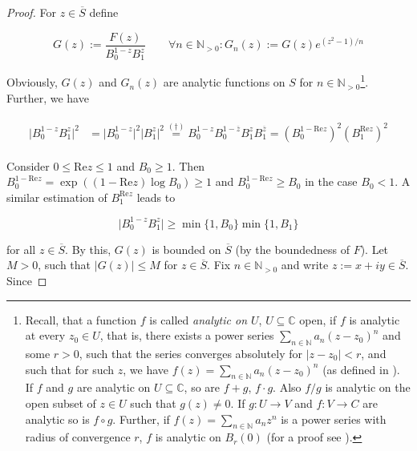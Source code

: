 \begin{proof}
	For $z \in \overline{S}$ define 

\begin{equation}
	G(z) := \frac{F(z)}{B_0^{1 - z}B_1^z} \qquad \forall n \in \mathbb{N}_{>0}: G_n(z) := G(z) e^{(z^2 - 1)/n} 
\end{equation}

Obviously, $G(z)$ and $G_n(z)$ are analytic functions on $S$ for $n \in \mathbb{N}_{>0}$\footnote{
						Recall, that a function $f$ is called \emph{analytic on $U$}, $U \subseteq \mathbb{C}$ open, if $f$ is analytic at every $z_0 \in U$, that is, there exists a power series $\sum_{n \in \mathbb{N}} a_n (z - z_0)^n$ and some $r > 0$, such that the series converges absolutely for $\vert z - z_0 \vert < r$, and such that for such $z$, we have $f(z) = \sum_{n \in \mathbb{N}} a_n (z - z_0)^n$ (as defined in \cite[68--69]{lang:complex_analysis:1993}). If $f$ and $g$ are analytic on $U \subseteq \mathbb{C}$, so are $f + g$, $f \cdot g$. Also $f/g$ is analytic on the open subset of $z \in U$ such that $g(z) \neq 0$. If $g:U \rightarrow V$ and $f: V \rightarrow C$ are analytic so is $f \circ g$. Further, if $f(z) = \sum_{n \in \mathbb{N}}a_n z^n$ is a power series with radius of convergence $r$, $f$ is analytic on $B_r(0)$ (for a proof see \cite[69--70]{lang:complex_analysis:1993}).	
					}. Further, we have

					\begin{gather}
						\begin{aligned}
							\vert B_0^{1 - z}B_1^z \vert^2 &= \vert B_0^{1 - z}\vert^2 \vert B_1^z \vert^2 \overset{(\dagger)}{=} B_0^{1 - z}B_0^{1 - \overline{z}} B_1^z B_1^{\overline{z}} = \left( B_0^{1 -\mathrm{Re}z} \right)^2 \left( B_1^{\mathrm{Re}z} \right)^2 
						\end{aligned}
					\end{gather}

					Consider $0 \leqslant \mathrm{Re} z \leqslant 1$ and $B_0 \geqslant 1$. Then  $B_0^{1 - \mathrm{Re}z} = \exp\left((1 - \mathrm{Re}z ) \log B_0\right) \geqslant 1$ and $B_0^{1 - \mathrm{Re} z } \geqslant B_0$ in the case $B_0 < 1$. A similar estimation of $B_1^{\mathrm{Re}z}$ leads to 

					\begin{equation}
						\vert B_0^{1 - z}B_1^z \vert \geqslant \min\{1,B_0\}\min\{1,B_1\}
					\end{equation}

					for all $z \in \overline{S}$. By this, $G(z)$ is bounded on $\overline{S}$ (by the boundedness of $F$). Let $M > 0$, such that $\vert G(z) \vert \leqslant M$ for $z \in \overline{S}$. Fix $n \in \mathbb{N}_{>0}$ and write $z := x + iy \in \overline{S}$. Since


\end{proof}
